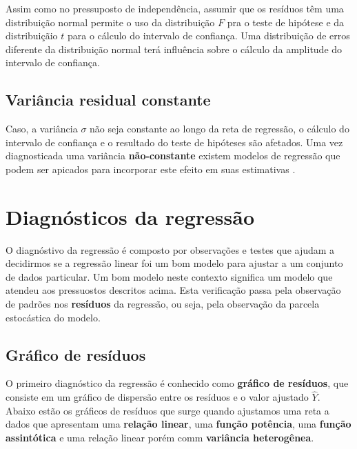 \documentclass[
]{book}
\begin{document}
Assim como no pressuposto de independência, assumir que os resíduos têm uma distribuição normal permite o uso da distribuição \(F\) pra o teste de hipótese e da distribuiçãio \(t\) para o cálculo do intervalo de confiança. Uma distribuição de erros diferente da distribuição normal terá influência sobre o cálculo da amplitude do intervalo de confiança.

\hypertarget{variuxe2ncia-residual-constante}{%
\subsection{Variância residual constante}\label{variuxe2ncia-residual-constante}}

Caso, a variância \(\sigma\) não seja constante ao longo da reta de regressão, o cálculo do intervalo de confiança e o resultado do teste de hipóteses são afetados. Uma vez diagnosticada uma variância \textbf{não-constante} existem modelos de regressão que podem ser apicados para incorporar este efeito em suas estimativas \citep{zuur2009mixed}.

\hypertarget{diagnuxf3sticos-da-regressuxe3o}{%
\section{Diagnósticos da regressão}\label{diagnuxf3sticos-da-regressuxe3o}}

O diagnóstivo da regressão é composto por observações e testes que ajudam a decidirmos se a regressão linear foi um bom modelo para ajustar a um conjunto de dados particular. Um bom modelo neste contexto significa um modelo que atendeu aos pressuostos descritos acima. Esta verificação passa pela observação de padrões nos \textbf{resíduos} da regressão, ou seja, pela observação da parcela estocástica do modelo.

\hypertarget{gruxe1fico-de-resuxedduos}{%
\subsection{Gráfico de resíduos}\label{gruxe1fico-de-resuxedduos}}

O primeiro diagnóstico da regressão é conhecido como \textbf{gráfico de resíduos}, que consiste em um gráfico de dispersão entre os resíduos e o valor ajustado \(\hat{Y}\). Abaixo estão os gráficos de resíduos que surge quando ajustamos uma reta a dados que apresentam uma \textbf{relação linear}, uma \textbf{função potência}, uma \textbf{função assintótica} e uma relação linear porém comm \textbf{variância heterogênea}.
\end{document}
